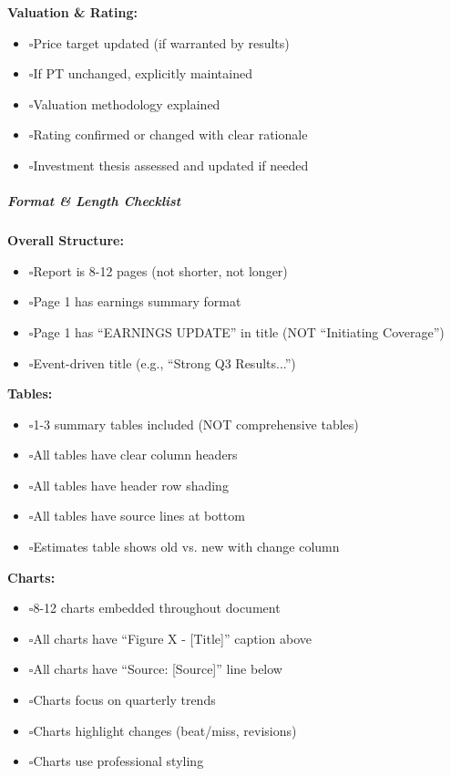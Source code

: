\documentclass[11pt]{article}
\newcommand{\UncheckedBox}{$\square$}
\begin{document}
\textbf{Valuation \& Rating:}

\begin{itemize}[leftmargin=*,itemsep=2pt,topsep=2pt]
\item {} \UncheckedBox Price target updated (if warranted by results)
\item {} \UncheckedBox If PT unchanged, explicitly maintained
\item {} \UncheckedBox Valuation methodology explained
\item {} \UncheckedBox Rating confirmed or changed with clear rationale
\item {} \UncheckedBox Investment thesis assessed and updated if needed
\end{itemize}

\subparagraph{Format \& Length Checklist}\mbox{}\par

\textbf{Overall Structure:}

\begin{itemize}[leftmargin=*,itemsep=2pt,topsep=2pt]
\item {} \UncheckedBox Report is 8-12 pages (not shorter, not longer)
\item {} \UncheckedBox Page 1 has earnings summary format
\item {} \UncheckedBox Page 1 has ``EARNINGS UPDATE'' in title (NOT ``Initiating Coverage'')
\item {} \UncheckedBox Event-driven title (e.g., ``Strong Q3 Results...'')
\end{itemize}

\textbf{Tables:}

\begin{itemize}[leftmargin=*,itemsep=2pt,topsep=2pt]
\item {} \UncheckedBox 1-3 summary tables included (NOT comprehensive tables)
\item {} \UncheckedBox All tables have clear column headers
\item {} \UncheckedBox All tables have header row shading
\item {} \UncheckedBox All tables have source lines at bottom
\item {} \UncheckedBox Estimates table shows old vs. new with change column
\end{itemize}

\textbf{Charts:}

\begin{itemize}[leftmargin=*,itemsep=2pt,topsep=2pt]
\item {} \UncheckedBox 8-12 charts embedded throughout document
\item {} \UncheckedBox All charts have ``Figure X - [Title]'' caption above
\item {} \UncheckedBox All charts have ``Source: [Source]'' line below
\item {} \UncheckedBox Charts focus on quarterly trends
\item {} \UncheckedBox Charts highlight changes (beat/miss, revisions)
\item {} \UncheckedBox Charts use professional styling
\end{itemize}
\end{document}
